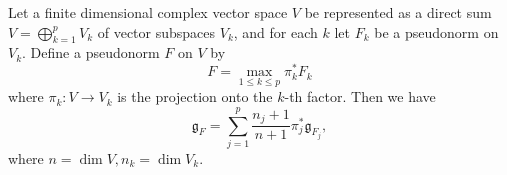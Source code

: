 \documentclass[10pt,a4paper]{amsart}
\newcommand{\g}{\mathfrak{g}}
\begin{document}
\begin{proposition} \label{prop-product}
    Let a finite dimensional complex vector space $V$ be represented as a direct sum $V=\bigoplus_{k=1}^p V_k$ of vector subspaces $V_k$, and for each $k$ let $F_k$ be a pseudonorm on $V_k$. Define a pseudonorm $F$ on $V$ by 
    \[F=\max_{1\leq k \leq p} \pi_k^* F_k\]
    where $\pi_k: V\to V_k$ is the projection onto the $k$-th factor. 
    Then we have 
    \[ \g_F= \sum_{j=1}^p\frac{n_j+1}{n+1} \pi_j^*\g_{F_j}, \]
    where $n=\dim V, n_k=\dim V_k$.
    
\end{proposition}
\end{document}

